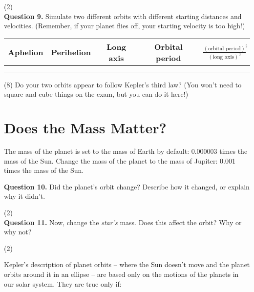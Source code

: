\documentclass[11pt]{article}
\begin{document}
\vspace{1.5cm}
(2) \hrulefill\\

\textbf{Question 9.} Simulate two different orbits with different starting distances and velocities. (Remember, if your planet flies off, your starting velocity is too high!)

\begin{center}
\Large
\begin{tabular}{| c | c | c | c | c |}
	\hline
	Aphelion & Perihelion & Long axis & Orbital period & $\frac{(\mbox{orbital period})^2}{(\mbox{long axis})^3}$ \\
	\hline
	& & & & \\[1.2cm]
	\hline
	& & & & \\[1.2cm]
	\hline
	\end{tabular}
\end{center}

(8) Do your two orbits appear to follow Kepler's third law? (You won't need to square and cube things on the exam, but you can do it here!)

\newpage

\section{Does the Mass Matter?}

The mass of the planet is set to the mass of Earth by default: 0.000003 times the mass of the Sun. Change the mass of the planet to the mass of Jupiter: 0.001 times the mass of the Sun. 

\textbf{Question 10.} Did the planet's orbit change? Describe how it changed, or explain why it didn't.

\vspace{1.5cm}

(2) \hrulefill\\

\textbf{Question 11.} Now, change the {\it star's} mass. Does this affect the orbit? Why or why not?

\vspace{1.5cm}

(2) \hrulefill\\

\vspace{3em}

Kepler's description of planet orbits -- where the Sun doesn't move and the planet orbits around it in an ellipse -- are based only on the motions of the planets in our solar system. They are true only if:
\end{document}
